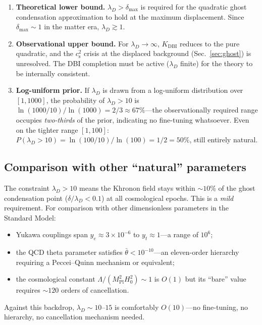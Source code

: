 \documentclass[prd,twocolumn,superscriptaddress,longbibliography,floatfix]{revtex4-2}
\newcommand{\cs}{c_{\mathrm{s}}}
\begin{document}
\begin{enumerate}
\item \textbf{Theoretical lower bound.}
$\lambda_D > \delta_{\max}$ is required for the
quadratic ghost condensation approximation to hold
at the maximum displacement.  Since
$\delta_{\max} \sim 1$ in the matter era,
$\lambda_D \gtrsim 1$.

\item \textbf{Observational upper bound.}
For $\lambda_D \to \infty$, $K_{\mathrm{DBI}}$ reduces
to the pure quadratic, and the $\cs^2$ crisis at the
displaced background (Sec.~\ref{sec:ghost}) is
unresolved.  The DBI completion must be active
($\lambda_D$ finite) for the theory to be internally
consistent.

\item \textbf{Log-uniform prior.}
If $\lambda_D$ is drawn from a log-uniform distribution
over $[1, 1000]$, the probability of
$\lambda_D > 10$ is
$\ln(1000/10)/\ln(1000) = 2/3 \approx 67\%$---the
observationally required range occupies \emph{two-thirds}
of the prior, indicating no fine-tuning whatsoever.
Even on the tighter range $[1, 100]$:
$P(\lambda_D > 10) = \ln(100/10)/\ln(100) = 1/2
= 50\%$, still entirely natural.
\end{enumerate}

\subsection{Comparison with other ``natural'' parameters}

The constraint $\lambda_D > 10$ means the Khronon
field stays within $\sim\!10\%$ of the ghost condensation
point ($\delta/\lambda_D < 0.1$) at all cosmological
epochs.  This is a \emph{mild} requirement.
For comparison with other dimensionless parameters in
the Standard Model:
\begin{itemize}
\item Yukawa couplings span
$y_e \approx 3 \times 10^{-6}$ to $y_t \approx 1$---a
range of $10^6$;
\item the QCD theta parameter satisfies
$\bar{\theta} < 10^{-10}$---an eleven-order hierarchy
requiring a Peccei--Quinn mechanism or equivalent;
\item the cosmological constant
$\Lambda/(M_{\mathrm{Pl}}^2 H_0^2) \sim 1$
is $O(1)$ but its ``bare'' value requires
$\sim\!120$ orders of cancellation.
\end{itemize}
Against this backdrop, $\lambda_D \sim 10$--$15$
is comfortably $O(10)$---no fine-tuning, no hierarchy,
no cancellation mechanism needed.
\end{document}
